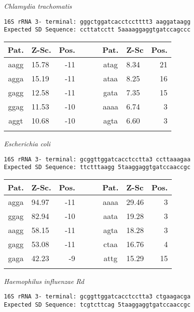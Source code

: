 \vspace{1em}
\noindent
{\it Chlamydia trachomatis    }
\begin{verbatim}
16S rRNA 3- terminal: gggctggatcacctcctttt3 aaggataagg
Expected SD Sequence: ccttatcctt 5aaaaggaggtgatccagccc
\end{verbatim}

\noindent
\begin{center}
\begin{tabular}{clrcclr}
Pat. & Z-Sc. & Pos. & \verb+   + & Pat. & Z-Sc & Pos. \\
\hline
aagg & 15.78 & -11 &  & atag & 8.34 & 21 \\
agga & 15.19 & -11 &  & ataa & 8.25 & 16 \\
gagg & 12.58 & -11 &  & gata & 7.35 & 15 \\
ggag & 11.53 & -10 &  & aaaa & 6.74 & 3 \\
aggt & 10.68 & -10 &  & agta & 6.60 & 3 \\
    &     \\
\end{tabular}
\end{center}

\vspace{1em}
\noindent
{\it Escherichia coli    }
\begin{verbatim}
16S rRNA 3- terminal: gcggttggatcacctcctta3 ccttaaagaa
Expected SD Sequence: ttctttaagg 5taaggaggtgatccaaccgc
\end{verbatim}

\noindent
\begin{center}
\begin{tabular}{clrcclr}
Pat. & Z-Sc. & Pos. & \verb+   + & Pat. & Z-Sc & Pos. \\
\hline
agga & 94.97 & -11 &  & aaaa & 29.46 & 3 \\
ggag & 82.94 & -10 &  & aata & 19.28 & 3 \\
aagg & 58.15 & -11 &  & agta & 18.28 & 3 \\
gagg & 53.08 & -11 &  & ctaa & 16.76 & 4 \\
gaga & 42.23 & -9 &  & attg & 15.29 & 15 \\
    &     \\
\end{tabular}
\end{center}

\vspace{1em}
\noindent
{\it Haemophilus influenzae Rd   }
\begin{verbatim}
16S rRNA 3- terminal: gcggttggatcacctcctta3 ctgaagacga
Expected SD Sequence: tcgtcttcag 5taaggaggtgatccaaccgc
\end{verbatim}

